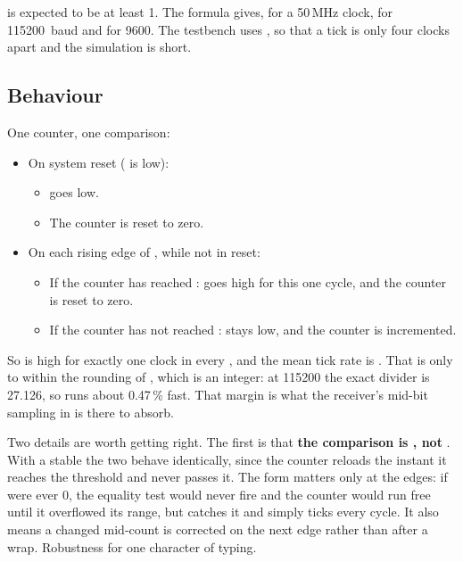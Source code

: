  is expected to be at least 1. The formula gives, for a 50\,MHz clock,  for
115200~baud and  for 9600. The testbench uses , so that a tick is only four
clocks apart and the simulation is short.

\subsection{Behaviour}
\label{c2:sec:baud_gen_behaviour}
One counter, one comparison:
\begin{itemize}
  \item On system reset ( is low):
  \begin{itemize}
    \item {} goes low.
    \item The counter is reset to zero.
  \end{itemize}
  \item On each rising edge of , while not in reset:
  \begin{itemize}
    \item If the counter has reached :  goes high for this one cycle, and
      the counter is reset to zero.
    \item If the counter has not reached :  stays low, and the counter is
      incremented.
  \end{itemize}
\end{itemize}

So  is high for exactly one clock in every , and the mean tick rate is
. That is  only to within the rounding of , which is an
integer: at 115200 the exact divider is 27.126, so  runs about 0.47\,\% fast. That
margin is what the receiver's mid-bit sampling in  is there to absorb.

Two details are worth getting right. The first is that \textbf{the comparison is
, not }. With a stable  the two behave
identically, since the counter reloads the instant it reaches the threshold and never passes it. The
\code{>=} form matters only at the edges: if  were ever 0, the equality test would never
fire and the counter would run free until it overflowed its range, but \code{>=} catches it and
simply ticks every cycle. It also means a  changed mid-count is corrected on the next
edge rather than after a wrap. Robustness for one character of typing.

